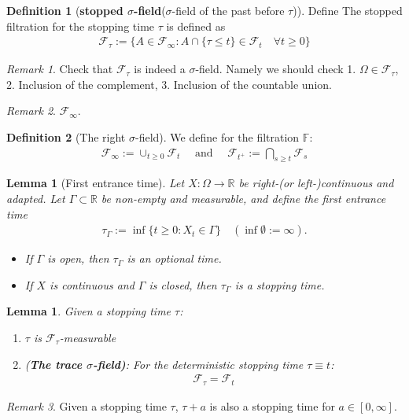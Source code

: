 \documentclass[a4paper,11pt]{book}
\newtheorem{lemma}[theorem]{Lemma}
\theoremstyle{definition}
\newtheorem{definition}{Definition}[section]
\theoremstyle{remark}
\newtheorem*{remark}{Remark}
\begin{document}
\begin{definition}[\textbf{stopped $\sigma$-field}($\sigma$-field of the past before $\tau$)]
Define
The stopped filtration for the stopping time $\tau$ is defined as 
\begin{align*}
	\mathcal{F}_\tau:= \{ A \in \mathcal{F}_\infty: A \cap \{ \tau \le t \} \in \mathcal{F}_t \quad \forall t \ge 0\}
\end{align*}
\end{definition}
\begin{remark}
Check that $\mathcal{F}_\tau$ is indeed a $\sigma$-field. Namely we should check 1. $\Omega \in \mathcal{F}_\tau$, 2. Inclusion of the complement, 3. Inclusion of the countable union. 	
\end{remark}
\begin{remark}
$\mathcal{F}_\infty$. 	
\end{remark}


\begin{definition}[The right $\sigma$-field]
	We define for the filtration $\mathbb{F}$: 
	\begin{align*}
	\mathcal{F}_\infty := \cup_{t \ge 0} \mathcal{F}_t
	\quad \text{ and } \quad \mathcal{F}_{t^+}:= \bigcap_{s \ge t} \mathcal{F}_s
\end{align*}

\end{definition}

\begin{lemma}[First entrance time]
	Let $X: \Omega \to \mathbb{R}$ be right-(or left-)continuous and adapted. Let $\Gamma \subset \mathbb{R}$ be non-empty and measurable, and define the first entrance time
	\begin{align*}
		\tau_\Gamma := \inf\{ t \ge 0: X_t \in \Gamma \} \quad (\inf \emptyset := \infty).
	\end{align*}
	\begin{itemize}
		\item If $\Gamma$ is open, then $\tau_\Gamma$ is an optional time.
		\item If $X$ is continuous and $\Gamma$ is closed, then $\tau_\Gamma$ is a stopping time.
	\end{itemize}
\end{lemma}

\begin{lemma}
	Given a stopping time $\tau$:
	\begin{enumerate}
		\item $\tau$ is $\mathcal{F}_\tau$-measurable
		\item (\textbf{The trace $\sigma$-field)}: For the deterministic stopping time $\tau \equiv t$: 
		\begin{align*}
			\mathcal{F}_\tau = \mathcal{F}_t
		\end{align*}
	\end{enumerate}
\end{lemma}
\begin{remark}
Given a stopping time $\tau$, $\tau + a$ is also a stopping time for $a \in [0, \infty]$.
\end{remark}
\end{document}
